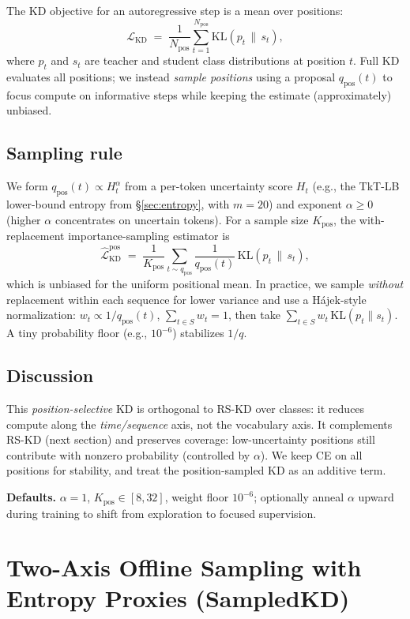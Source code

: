 \documentclass[11pt]{article}
\begin{document}
The KD objective for an autoregressive step is a mean over positions:
\[
	\mathcal{L}_{\text{KD}} \;=\; \frac{1}{N_{\text{pos}}} \sum_{t=1}^{N_{\text{pos}}}
	\mathrm{KL}\!\left(p_t \,\|\, s_t\right),
\]
where $p_t$ and $s_t$ are teacher and student class distributions at position $t$.
Full KD evaluates all positions; we instead \emph{sample positions} using a proposal
$q_{\text{pos}}(t)$ to focus compute on informative steps while keeping the estimate (approximately) unbiased.

\subsection{Sampling rule}
We form $q_{\text{pos}}(t) \propto H_t^\alpha$ from a per-token uncertainty score $H_t$
(e.g., the TkT-LB lower-bound entropy from \S\ref{sec:entropy}, with $m{=}20$) and exponent $\alpha\!\ge\!0$ (higher $\alpha$ concentrates on uncertain tokens). For a sample size $K_{\text{pos}}$, the with-replacement importance-sampling estimator is
\[
	\widehat{\mathcal{L}}_{\text{KD}}^{\text{pos}} \;=\;
	\frac{1}{K_{\text{pos}}} \sum_{t \sim q_{\text{pos}}}
	\frac{1}{q_{\text{pos}}(t)} \,\mathrm{KL}\!\left(p_t \,\|\, s_t\right),
\]
which is unbiased for the uniform positional mean. In practice, we sample \emph{without} replacement within each sequence for lower variance and use a Hájek-style normalization: $w_t \propto 1/q_{\text{pos}}(t)$, $\sum_{t\in S} w_t=1$, then take $\sum_{t\in S} w_t\,\mathrm{KL}(p_t\|s_t)$.
A tiny probability floor (e.g., $10^{-6}$) stabilizes $1/q$.

\subsection{Discussion}
This \emph{position-selective} KD is orthogonal to RS-KD over classes: it reduces compute along the \emph{time/sequence} axis, not the vocabulary axis. It complements RS-KD (next section) and preserves coverage: low-uncertainty positions still contribute with nonzero probability (controlled by $\alpha$).
We keep CE on all positions for stability, and treat the position-sampled KD as an additive term.

\vspace{0.5em}
\noindent\textbf{Defaults.}
$\alpha{=}1$, $K_{\text{pos}}\!\in\![8,32]$, weight floor $10^{-6}$; optionally anneal $\alpha$ upward during training to shift from exploration to focused supervision.


\section{Two-Axis Offline Sampling with Entropy Proxies (SampledKD)}
\label{sec:twoaxis}
\end{document}
